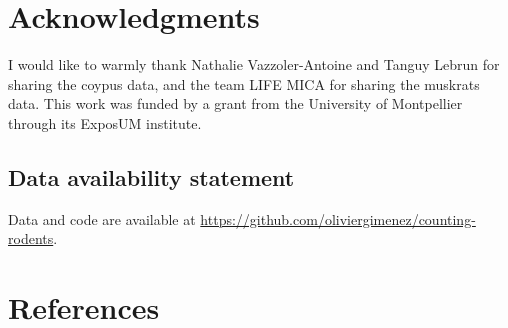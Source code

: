 \documentclass[
  11pt,
  a4paper,
]{article}
\begin{document}
\section{Acknowledgments}\label{acknowledgments}

I would like to warmly thank Nathalie Vazzoler-Antoine and Tanguy Lebrun for sharing the coypus data, and the team LIFE MICA for sharing the muskrats data. This work was funded by a grant from the University of Montpellier through its ExposUM institute.

\subsection{Data availability statement}\label{data-availability-statement}

Data and code are available at \href{https://github.com/oliviergimenez/counting-rodents}{https://github.com/oliviergimenez/counting-rodents}.

\section{References}\label{references}
\end{document}
